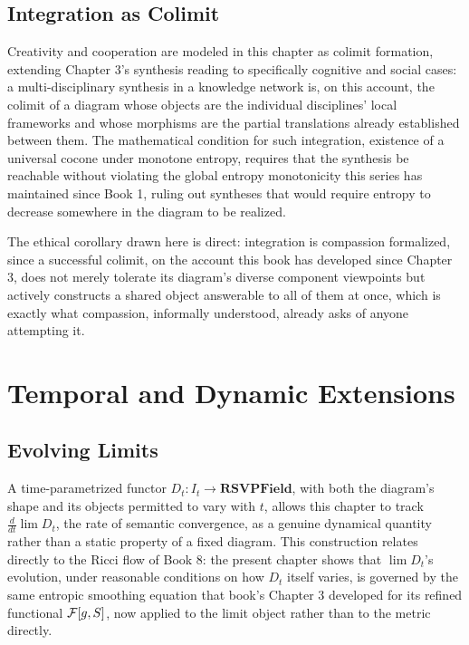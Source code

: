 \chapter{Integration as Colimit}

Creativity and cooperation are modeled in this chapter as colimit formation, extending Chapter 3's synthesis reading to specifically cognitive and social cases: a multi-disciplinary synthesis in a knowledge network is, on this account, the colimit of a diagram whose objects are the individual disciplines' local frameworks and whose morphisms are the partial translations already established between them. The mathematical condition for such integration, existence of a universal cocone under monotone entropy, requires that the synthesis be reachable without violating the global entropy monotonicity this series has maintained since Book 1, ruling out syntheses that would require entropy to decrease somewhere in the diagram to be realized.

The ethical corollary drawn here is direct: integration is compassion formalized, since a successful colimit, on the account this book has developed since Chapter 3, does not merely tolerate its diagram's diverse component viewpoints but actively constructs a shared object answerable to all of them at once, which is exactly what compassion, informally understood, already asks of anyone attempting it.

\part{Temporal and Dynamic Extensions}

\chapter{Evolving Limits}

A time-parametrized functor $D_t: I_t \to \mathbf{RSVPField}$, with both the diagram's shape and its objects permitted to vary with $t$, allows this chapter to track $\frac{d}{dt} \lim D_t$, the rate of semantic convergence, as a genuine dynamical quantity rather than a static property of a fixed diagram. This construction relates directly to the Ricci flow of Book 8: the present chapter shows that $\lim D_t$'s evolution, under reasonable conditions on how $D_t$ itself varies, is governed by the same entropic smoothing equation that book's Chapter 3 developed for its refined functional $\mathcal{F}[g,S]$, now applied to the limit object rather than to the metric directly.

